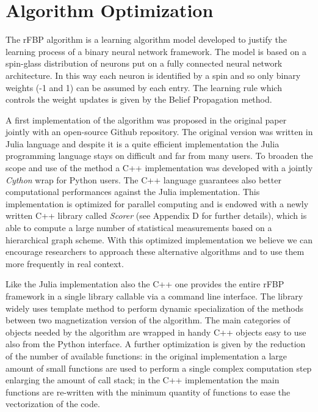 \documentclass{standalone}
\begin{document}
\section[Algorithm Optimization]{Algorithm Optimization}\label{rfbp:rFBP}

The rFBP algorithm is a learning algorithm model developed to justify the learning process of a binary neural network framework.
The model is based on a spin-glass distribution of neurons put on a fully connected neural network architecture.
In this way each neuron is identified by a spin and so only binary weights (-1 and 1) can be assumed by each entry.
The learning rule which controls the weight updates is given by the Belief Propagation method.

A first implementation of the algorithm was proposed in the original paper~\cite{BaldassiE7655} jointly with an open-source Github repository.
The original version was written in Julia language and despite it is a quite efficient implementation the Julia programming language stays on difficult and far from many users.
To broaden the scope and use of the method a C++ implementation was developed with a jointly \emph{Cython} wrap for Python users.
The C++ language guarantees also better computational performances against the Julia implementation.
This implementation is optimized for parallel computing and is endowed with a newly written C++ library called \emph{Scorer} (see Appendix D for further details), which is able to compute a large number of statistical measurements based on a hierarchical graph scheme.
With this optimized implementation we believe we can encourage researchers to approach these alternative algorithms and to use them more frequently in real context.

Like the Julia implementation also the C++ one provides the entire rFBP framework in a single library callable via a command line interface.
The library widely uses template method to perform dynamic specialization of the methods between two magnetization version of the algorithm.
The main categories of objects needed by the algorithm are wrapped in handy C++ objects easy to use also from the Python interface.
A further optimization is given by the reduction of the number of available functions: in the original implementation a large amount of small functions are used to perform a single complex computation step enlarging the amount of call stack; in the C++ implementation the main functions are re-written with the minimum quantity of functions to ease the vectorization of the code.
\end{document}
